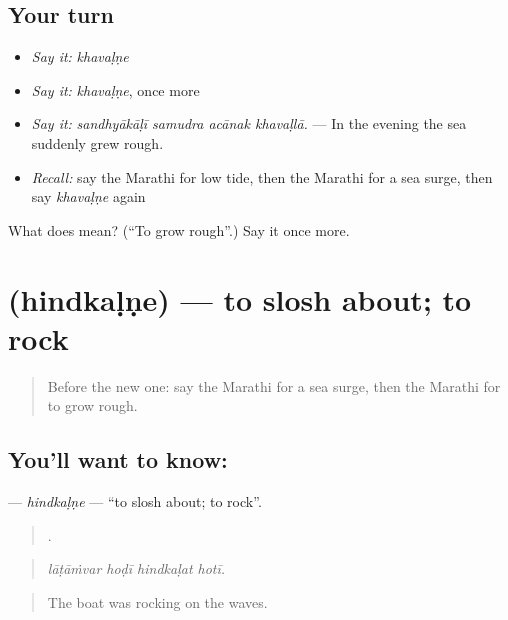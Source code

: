 \subsection*{Your turn}
\begin{itemize}
\raggedright
  \item \emph{Say it:} \emph{khavaḷṇe}
  \item \emph{Say it:} \emph{khavaḷṇe}, once more
  \item \emph{Say it:} \emph{sandhyākāḷī samudra acānak khavaḷlā.} — In the evening the sea suddenly grew rough.
  \item \emph{Recall:} say the Marathi for low tide, then the Marathi for a sea surge, then say \emph{khavaḷṇe} again
\end{itemize}

\begin{tcolorbox}[breakable,colback=teal!4,colframe=teal!35!black,title={Before you move on}]
What does  mean? (\textquotedblleft{}To grow rough\textquotedblright{}.) Say it once more.
\end{tcolorbox}
\section[\texorpdfstring{\mr{हिंदकळणे} (hindkaḷṇe)}{हिंदकळणे (hindkaḷṇe)}]{ (hindkaḷṇe) — to slosh about; to rock}

\label{lesson:MR-C409-hindkalne}



\begin{quote}
Before the new one: say the Marathi for a sea surge, then the Marathi for to grow rough.
\end{quote}

\subsection*{You'll want to know: }
\textbf{} — \emph{hindkaḷṇe} — \textquotedblleft{}to slosh about; to rock\textquotedblright{}.

\begin{quote}
   .
\end{quote}

\begin{quote}
\emph{lāṭāṁvar hoḍī hindkaḷat hotī.}
\end{quote}

\begin{quote}
The boat was rocking on the waves.
\end{quote}

